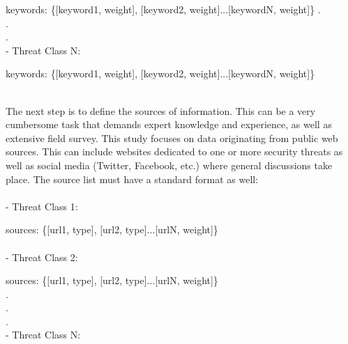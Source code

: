 \documentclass[12pt]{article}
\begin{document}
keywords: \{[keyword1, weight], [keyword2, weight]...[keywordN, weight]\}
.\\
.\\
.\\
- Threat Class N:

keywords: \{[keyword1, weight], [keyword2, weight]...[keywordN, weight]\}
 
\hfill \break \\
The next step is to define the sources of information. This can be a very cumbersome task that demands expert knowledge and experience, as well as extensive field survey. This study focuses on data originating from public web sources. This can include websites dedicated to one or more security threats as well as social media (Twitter, Facebook, etc.) where general discussions take place. The source list must have a standard format as well:\\\\
- Threat Class 1:

sources: \{[url1, type], [url2, type]...[urlN, weight]\}\\\\
- Threat Class 2:

sources: \{[url1, type], [url2, type]...[urlN, weight]\}\\
.\\
.\\
.\\
- Threat Class N:
\end{document}
